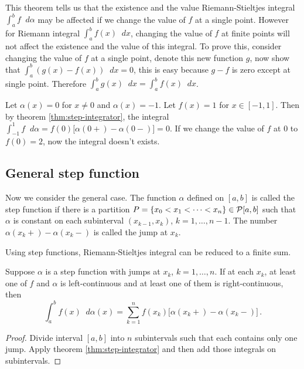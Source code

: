 \documentclass{article}
\newcommand{\Partition}{\mathcal P}
\DeclarePairedDelimiter\set{\lbrace}{\rbrace}
\newcommand{\dd}{\mathop{}\!d}
\begin{document}
This theorem tells us that the existence and the value Riemann-Stieltjes integral $ \int_a^b f \dd \alpha $ may be affected if we change the value of $ f $ at a single point. However for Riemann integral $ \int_a^b f(x) \dd x $, changing the value of $ f $ at finite points will not affect the existence and the value of this integral. To prove this, consider changing the value of $ f $ at a single point, denote this new function $ g $, now show that $ \int_a^b (g(x) - f(x)) \dd x = 0 $, this is easy because $ g - f $ is zero except at single point. Therefore $ \int_a^b g(x) \dd x =  \int_a^b f(x) \dd x $. 

\begin{example}
    Let $ \alpha(x) = 0 $ for $ x \neq 0 $ and $ \alpha(x) = -1 $. Let $ f(x) = 1 $ for $ x \in [-1, 1] $. Then by theorem \ref{thm:step-integrator}, the integral $ \int_{-1}^1 f \dd \alpha = f(0) \big[ \alpha(0+) - \alpha(0-) \big] = 0 $. If we change the value of $ f $ at $ 0 $ to $ f(0) = 2 $, now the integral doesn't exists.
\end{example}

\subsection{General step function}

Now we consider the general case. The function $ \alpha $ defined on $ [a, b] $ is called the step function if there is a partition $ P = \set{x_0 < x_1 < \cdots < x_n} \in \Partition[a, b] $ such that $ \alpha $ is constant on each subinterval $ (x_{k-1}, x_k) $, $ k = 1, \dots, n-1 $. The number $ \alpha(x_k+) - \alpha(x_k-) $ is called the jump at $ x_k $.

Using step functions, Riemann-Stieltjes integral can be reduced to a finite sum.
\begin{theorem}
    Suppose $ \alpha $ is a step function with jumps at $ x_k $, $ k = 1, \dots, n $. If at each $ x_k $, at least one of $ f $ and $ \alpha $ is left-continuous and at least one of them is right-continuous, then
    \[ 
        \int_a^b f(x) \dd \alpha(x) = \sum_{k=1}^{n} f(x_k) \big[ \alpha(x_k+) - \alpha(x_k-) \big] \,.
    \]
\end{theorem}

\begin{proof}
    Divide interval $ [a, b] $ into $ n $ subintervals such that each contains only one jump. Apply theorem \ref{thm:step-integrator} and then add those integrals on subintervals.
\end{proof}
\end{document}
